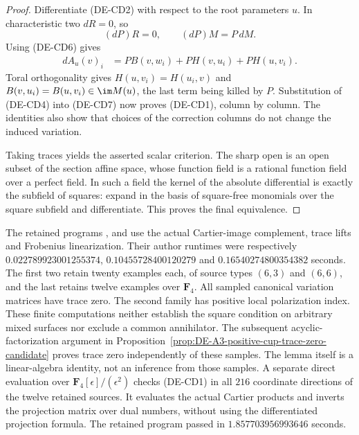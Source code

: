 \begin{proof}
Differentiate (DE-CD2) with respect to the root parameters $u$.
In characteristic two $dR=0$, so
\[
                  (dP)R=0,\qquad(dP)M=P\,dM.
\]
Using (DE-CD6) gives
\[
 \begin{aligned}
 dA_u(v)_i
 &=P B(v,w_i)+P H(v,u_i)+P H(u,v_i).
 \end{aligned}
                                                        \tag{DE-CD8}
\]
Toral orthogonality gives $H(u,v_i)=H(u_i,v)$ and
$B(v,u_i)=B(u,v_i)\in\im M(u)$, the last term being killed by $P$.
Substitution of (DE-CD4) into (DE-CD7) now proves (DE-CD1), column by
column. The identities also show that choices of the correction
columns do not change the induced variation.

Taking traces yields the asserted scalar criterion. The sharp open
is an open subset of the section affine space, whose function field
is a rational function field over a perfect field. In such a field
the kernel of the absolute differential is exactly the subfield of
squares: expand in the basis of square-free monomials over the square
subfield and differentiate. This proves the final equivalence.
\end{proof}

\begin{remark}
\label{rem:DE-A3-positive-cup-derivative-scope-candidate}
The retained programs
,
and
use the actual Cartier-image complement, trace lifts and Frobenius
linearization. Their author runtimes were respectively
$0.022789923001255374$, $0.10455728400120279$ and
$0.16540274800354382$ seconds. The first two retain twenty examples
each, of source types $(6,3)$ and $(6,6)$, and the last retains twelve
examples over $\mathbf F_4$. All sampled canonical variation matrices
have trace zero. The second family has positive local polarization
index. These finite computations neither establish the square
condition on arbitrary mixed surfaces nor exclude a common
annihilator. The subsequent acyclic-factorization argument in
Proposition~\ref{prop:DE-A3-positive-cup-trace-zero-candidate}
proves trace zero independently of these samples. The lemma itself is a linear-algebra identity, not an
inference from those samples.
A separate direct evaluation over $\mathbf F_4[\epsilon]/(\epsilon^2)$
checks (DE-CD1) in all $216$ coordinate directions of the twelve retained
sources. It evaluates the actual Cartier products and inverts the
projection matrix over dual numbers, without using the differentiated
projection formula. The retained program
passed in $1.857703956993646$ seconds.
\end{remark}
